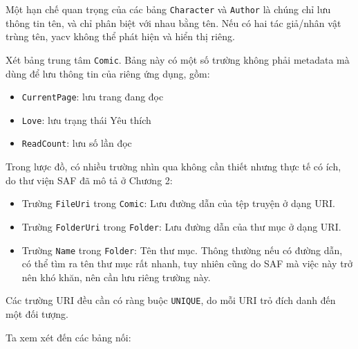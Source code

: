 \documentclass[
]{article}
\begin{document}
Một hạn chế quan trọng của các bảng \texttt{Character} và
\texttt{Author} là chúng chỉ lưu thông tin tên, và chỉ phân biệt với
nhau bằng tên. Nếu có hai tác giả/nhân vật trùng tên, yacv không thể
phát hiện và hiển thị riêng.

Xét bảng trung tâm \texttt{Comic}. Bảng này có một số trường không phải
metadata mà dùng để lưu thông tin của riêng ứng dụng, gồm:

\begin{itemize}
\item
  \texttt{CurrentPage}: lưu trang đang đọc
\item
  \texttt{Love}: lưu trạng thái Yêu thích
\item
  \texttt{ReadCount}: lưu số lần đọc
\end{itemize}

Trong lược đồ, có nhiều trường nhìn qua không cần thiết nhưng thực tế có
ích, do thư viện SAF đã mô tả ở Chương 2:

\begin{itemize}
\item
  Trường \texttt{FileUri} trong \texttt{Comic}: Lưu đường dẫn của tệp
  truyện ở dạng URI.
\item
  Trường \texttt{FolderUri} trong \texttt{Folder}: Lưu đường dẫn của thư
  mục ở dạng URI.
\item
  Trường \texttt{Name} trong \texttt{Folder}: Tên thư mục. Thông thường
  nếu có đường dẫn, có thể tìm ra tên thư mục rất nhanh, tuy nhiên cũng
  do SAF mà việc này trở nên khó khăn, nên cần lưu riêng trường này.
\end{itemize}

Các trường URI đều cần có ràng buộc \texttt{UNIQUE}, do mỗi URI trỏ đích
danh đến một đối tượng.

Ta xem xét đến các bảng nối:
\end{document}
